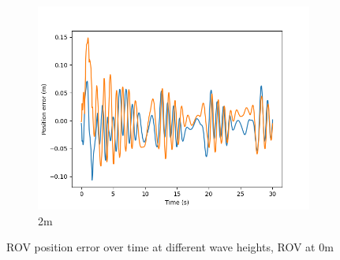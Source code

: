 \documentclass[class=article, crop=false]{standalone}
\begin{document}
\begin{figure}
\begin{subfigure}[b]{0.48\textwidth}
        \centering
        \includegraphics{scenario1/rov-0m/2.0m/rov_position_error_uncontrolled}
        \caption{2m}
        \label{}
    \end{subfigure}

    \caption{ROV position error over time at different wave heights, ROV at 0m}
\end{figure}
\end{document}

